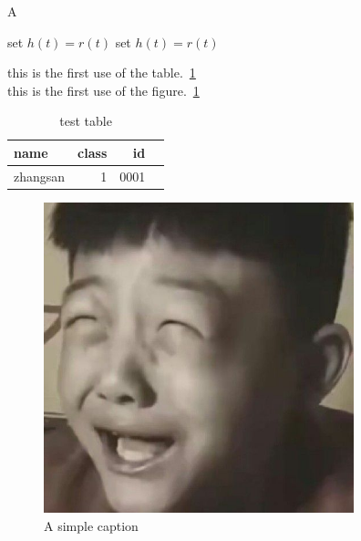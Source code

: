 \documentclass[conference]{IEEEtran}
\begin{document}
\begin{algorithm}
\caption{A}
\label{alg:A}
\begin{algorithmic}
\REPEAT 
\STATE set $h(t)=r(t)$ 
\REPEAT
\STATE set $h(t)=r(t)$ 
\end{algorithmic}
\end{algorithm}











\begin{flushright}
this is the first use of the table.~\ref{table-sample}\\
this is the first use of the figure.~\ref{figure-sample}
\end{flushright}

\begin{table}
\centering
\caption{test table}
\label{table-sample}
\begin{tabular}{p{15.1em}|r|r|r}
\hline
name & class & id \\
\hline
zhangsan & 1 & 0001 \\
\end{tabular}


\end{table}




\begin{figure}[ht!]
\centering
\includegraphics[width=90mm]{QQ图片20200902064302.jpg}
\caption{A simple caption \label{figure-sample}}

\end{figure}
\end{document}
